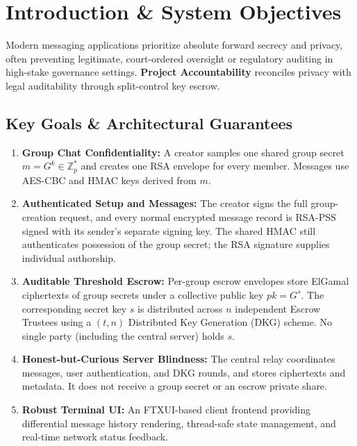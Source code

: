 \documentclass[11pt,a4paper]{article}
\begin{document}
\newpage
{}

\tableofcontents
\newpage
\listoffigures
\listoftables
\newpage


\section{Introduction \& System Objectives}
\label{sec:introduction}

Modern messaging applications prioritize absolute forward secrecy and privacy, often preventing legitimate, court-ordered oversight or regulatory auditing in high-stake governance settings. \textbf{Project Accountability} reconciles privacy with legal auditability through split-control key escrow.

\subsection{Key Goals \& Architectural Guarantees}
\begin{enumerate}
	\item \textbf{Group Chat Confidentiality:} A creator samples one shared group secret $m=G^k \in \mathbb{Z}_p^*$ and creates one RSA envelope for every member. Messages use AES-CBC and HMAC keys derived from $m$.
	\item \textbf{Authenticated Setup and Messages:} The creator signs the full group-creation request, and every normal encrypted message record is RSA-PSS signed with its sender's separate signing key. The shared HMAC still authenticates possession of the group secret; the RSA signature supplies individual authorship.
	\item \textbf{Auditable Threshold Escrow:} Per-group escrow envelopes store ElGamal ciphertexts of group secrets under a collective public key $pk = G^s$. The corresponding secret key $s$ is distributed across $n$ independent Escrow Trustees using a $(t,n)$ Distributed Key Generation (DKG) scheme. No single party (including the central server) holds $s$.
	\item \textbf{Honest-but-Curious Server Blindness:} The central relay coordinates messages, user authentication, and DKG rounds, and stores ciphertexts and metadata. It does not receive a group secret or an escrow private share.
	\item \textbf{Robust Terminal UI:} An FTXUI-based client frontend providing differential message history rendering, thread-safe state management, and real-time network status feedback.
\end{enumerate}
\end{document}
